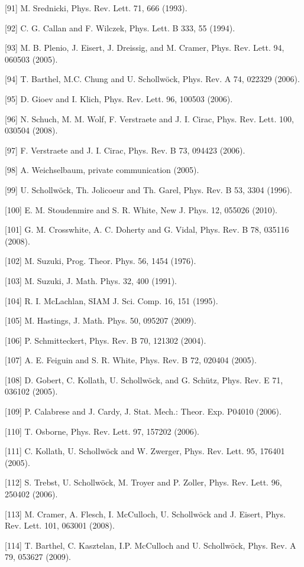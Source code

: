 \documentclass[12pt]{article}
\begin{document}
[91] M. Srednicki, Phys. Rev. Lett. 71, 666 (1993).

[92] C. G. Callan and F. Wilczek, Phys. Lett. B 333, 55 (1994).

[93] M. B. Plenio, J. Eisert, J. Dreissig, and M. Cramer, Phys. Rev. Lett. 94, 060503 (2005).

[94] T. Barthel, M.C. Chung and U. Schollwöck, Phys. Rev. A 74, 022329 (2006).

[95] D. Gioev and I. Klich, Phys. Rev. Lett. 96, 100503 (2006).

[96] N. Schuch, M. M. Wolf, F. Verstraete and J. I. Cirac, Phys. Rev. Lett. 100, 030504 (2008).

[97] F. Verstraete and J. I. Cirac, Phys. Rev. B 73, 094423 (2006).

[98] A. Weichselbaum, private communication (2005).

[99] U. Schollwöck, Th. Jolicoeur and Th. Garel, Phys. Rev. B 53, 3304 (1996).

[100] E. M. Stoudenmire and S. R. White, New J. Phys. 12, 055026 (2010).

[101] G. M. Crosswhite, A. C. Doherty and G. Vidal, Phys. Rev. B 78, 035116 (2008).

[102] M. Suzuki, Prog. Theor. Phys. 56, 1454 (1976).

[103] M. Suzuki, J. Math. Phys. 32, 400 (1991).

[104] R. I. McLachlan, SIAM J. Sci. Comp. 16, 151 (1995).

[105] M. Hastings, J. Math. Phys. 50, 095207 (2009).

[106] P. Schmitteckert, Phys. Rev. B 70, 121302 (2004).

[107] A. E. Feiguin and S. R. White, Phys. Rev. B 72, 020404 (2005).

[108] D. Gobert, C. Kollath, U. Schollwöck, and G. Schütz, Phys. Rev. E 71, 036102 (2005).

[109] P. Calabrese and J. Cardy, J. Stat. Mech.: Theor. Exp. P04010 (2006).

[110] T. Osborne, Phys. Rev. Lett. 97, 157202 (2006).

[111] C. Kollath, U. Schollwöck and W. Zwerger, Phys. Rev. Lett. 95, 176401 (2005).

[112] S. Trebst, U. Schollwöck, M. Troyer and P. Zoller, Phys. Rev. Lett. 96, 250402 (2006).

[113] M. Cramer, A. Flesch, I. McCulloch, U. Schollwöck and J. Eisert, Phys. Rev. Lett. 101, 063001 (2008).

[114] T. Barthel, C. Kasztelan, I.P. McCulloch and U. Schollwöck, Phys. Rev. A 79, 053627 (2009).
\end{document}
